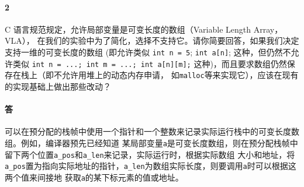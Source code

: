 \documentclass[UTF8]{ctexart}
\newcommand{\T}[1]{\texttt{{#1}}}
\begin{document}
        \paragraph{2} C 语言规范规定，允许局部变量是可变长度的数组（Variable Length Array，VLA），
        在我们的实验中为了简化，选择不支持它。请你简要回答，如果我们决定支持一维的可变长度的数组
        (即允许类似 \T{int n = 5}; \T{int a[n]}; 这种，但仍然不允许类似 \T{int n = ...; int m = ...; int a[n][m];} 
        这种)，而且要求数组仍然保存在栈上（即不允许用堆上的动态内存申请，
        如\T{malloc}等来实现它），应该在现有的实现基础上做出那些改动？
        \paragraph{答} 可以在预分配的栈帧中使用一个指针和一个整数来记录实际运行栈中的可变长度数组。例如，编译器预先已经知道
        某局部变量\T{a}是可变长度数组，则在预分配栈帧中留下两个位置\T{a\_pos}和\T{a\_len}来记录，实际运行时，根据实际数组
        大小和地址，将\T{a\_pos}置为指向实际地址的指针，\T{a\_len}为数组实际长度，则要调用\T{a}时可以根据这两个值来间接地
        获取\T{a}的某下标元素的值或地址。
\end{document}

